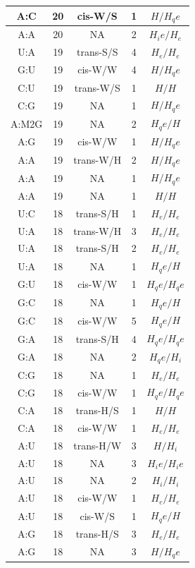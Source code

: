 \begin{center}
\begin{longtable}{c|c|c|c|c}
A:C & 20 & cis-W/S & 1 & $H/H_qe$ \\  \hline
A:A & 20 & NA & 2 & $H_ie/H_e$ \\  \hline
U:A & 19 & trans-S/S & 4 & $H_e/H_e$ \\  \hline
G:U & 19 & cis-W/W & 4 & $H/H_qe$ \\  \hline
C:U & 19 & trans-W/S & 1 & $H/H$ \\  \hline
C:G & 19 & NA & 1 & $H/H_qe$ \\  \hline
A:M2G & 19 & NA & 2 & $H_qe/H$ \\  \hline
A:G & 19 & cis-W/W & 1 & $H/H_qe$ \\  \hline
A:A & 19 & trans-W/H & 2 & $H/H_qe$ \\  \hline
A:A & 19 & NA & 1 & $H/H_qe$ \\  \hline
A:A & 19 & NA & 1 & $H/H$ \\  \hline
U:C & 18 & trans-S/H & 1 & $H_e/H_e$ \\  \hline
U:A & 18 & trans-W/H & 3 & $H_e/H_e$ \\  \hline
U:A & 18 & trans-S/H & 2 & $H_e/H_e$ \\  \hline
U:A & 18 & NA & 1 & $H_qe/H$ \\  \hline
G:U & 18 & cis-W/W & 1 & $H_qe/H_qe$ \\  \hline
G:C & 18 & NA & 1 & $H_qe/H$ \\  \hline
G:C & 18 & cis-W/W & 5 & $H_qe/H$ \\  \hline
G:A & 18 & trans-S/H & 4 & $H_qe/H_qe$ \\  \hline
G:A & 18 & NA & 2 & $H_qe/H_i$ \\  \hline
C:G & 18 & NA & 1 & $H_e/H_e$ \\  \hline
C:G & 18 & cis-W/W & 1 & $H_qe/H_qe$ \\  \hline
C:A & 18 & trans-H/S & 1 & $H/H$ \\  \hline
C:A & 18 & cis-W/W & 1 & $H_e/H_e$ \\  \hline
A:U & 18 & trans-H/W & 3 & $H/H_i$ \\  \hline
A:U & 18 & NA & 3 & $H_ie/H_ie$ \\  \hline
A:U & 18 & NA & 2 & $H_i/H_i$ \\  \hline
A:U & 18 & cis-W/W & 1 & $H_e/H_e$ \\  \hline
A:U & 18 & cis-W/S & 1 & $H_qe/H$ \\  \hline
A:G & 18 & trans-H/S & 3 & $H_e/H_e$ \\  \hline
A:G & 18 & NA & 3 & $H/H_qe$ \\  \hline

\end{longtable}
\end{center}
